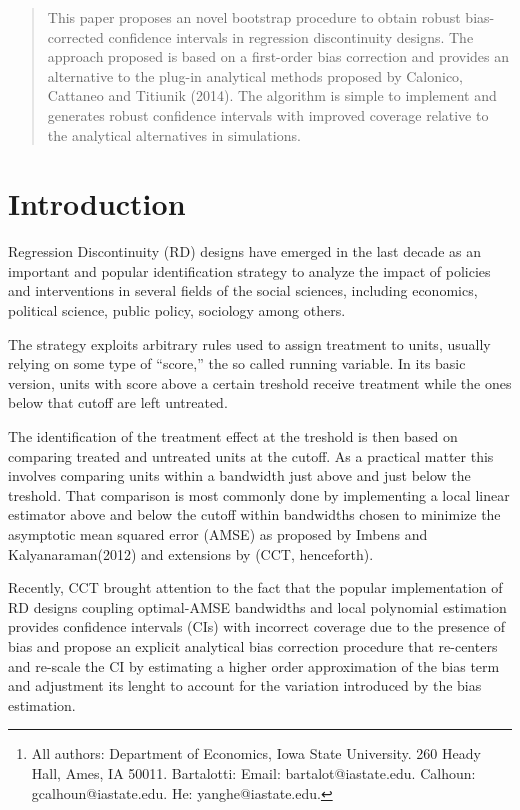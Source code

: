 \documentclass[12pt,fleqn]{article}
\author{Ot\'avio Bartalotti \and Gray Calhoun \and Yang He\thanks{All authors: 
Department of Economics, Iowa State University. 260 Heady Hall, Ames, IA  50011.
Bartalotti: Email: bartalot@iastate.edu. Calhoun: gcalhoun@iastate.edu.
He: yanghe@iastate.edu.}}
\begin{document}
\maketitle

\begin{abstract}
This paper proposes an novel bootstrap procedure to obtain robust bias-corrected
confidence intervals in regression discontinuity designs. The approach proposed 
is based on a first-order bias correction and provides an alternative
to the plug-in analytical methods proposed by Calonico, Cattaneo and Titiunik (2014).
The algorithm is simple to implement and generates robust confidence intervals
with improved coverage relative to the analytical alternatives in simulations.
\end{abstract}

\section{Introduction}
Regression Discontinuity (RD) designs have emerged in the last decade as an 
important and popular identification strategy to analyze the impact of policies
and interventions in several fields of the social sciences, including economics,
political science, public policy, sociology among others.

The strategy exploits arbitrary rules used to assign treatment to units, usually
relying on some type of ``score,'' the so called running variable. In its basic 
version, units with score above a certain treshold receive treatment while the 
ones below that cutoff are left untreated.

The identification of the treatment effect at the treshold is then based on 
comparing treated and untreated units at the cutoff. As a practical matter this 
involves comparing units within a bandwidth just above and just below the 
treshold. That comparison is most commonly done by implementing a local linear
estimator above and below the cutoff within bandwidths chosen to minimize the 
asymptotic mean squared error (AMSE) as proposed by Imbens and Kalyanaraman(2012)
and extensions by \cite{calonico2014} (CCT, henceforth).

Recently, CCT brought attention to the fact that the popular implementation of RD designs coupling optimal-AMSE bandwidths
and local polynomial estimation provides confidence intervals (CIs) with
incorrect coverage due to the presence of bias and propose an explicit analytical
bias correction procedure that re-centers and re-scale the CI by estimating a higher 
order approximation of the bias term and adjustment its lenght to account for 
the variation introduced by the bias estimation.
\end{document}
